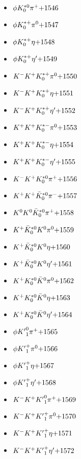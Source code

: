\begin{multicols}{3}
\begin{itemize}
 \item $ \phi K_{0}^{*0} \pi^{+} \hfill{+1546}$
 \item $ \phi K_{0}^{*+} \pi^{0} \hfill{+1547}$
 \item $ \phi K_{0}^{*+} \eta \hfill{+1548}$
 \item $ \phi K_{0}^{*+} {\eta^{\prime}} \hfill{+1549}$
 \item $ K^{-} K^{+} K_{0}^{*+} \pi^{0} \hfill{+1550}$
 \item $ K^{-} K^{+} K_{0}^{*+} \eta \hfill{+1551}$
 \item $ K^{-} K^{+} K_{0}^{*+} {\eta^{\prime}} \hfill{+1552}$
 \item $ K^{+} K^{+} K_{0}^{*-} \pi^{0} \hfill{+1553}$
 \item $ K^{+} K^{+} K_{0}^{*-} \eta \hfill{+1554}$
 \item $ K^{+} K^{+} K_{0}^{*-} {\eta^{\prime}} \hfill{+1555}$
 \item $ K^{-} K^{+} K_{0}^{*0} \pi^{+} \hfill{+1556}$
 \item $ K^{+} K^{+} \bar{K}_{0}^{*0} \pi^{-} \hfill{+1557}$
 \item $ K^{0} K^{0} \bar{K}_{0}^{*0} \pi^{+} \hfill{+1558}$
 \item $ K^{+} \bar{K}_{0}^{*0} K^{0} \pi^{0} \hfill{+1559}$
 \item $ K^{+} \bar{K}_{0}^{*0} K^{0} \eta \hfill{+1560}$
 \item $ K^{+} \bar{K}_{0}^{*0} K^{0} {\eta^{\prime}} \hfill{+1561}$
 \item $ K^{+} K_{0}^{*0} \bar{K}^{0} \pi^{0} \hfill{+1562}$
 \item $ K^{+} K_{0}^{*0} \bar{K}^{0} \eta \hfill{+1563}$
 \item $ K^{+} K_{0}^{*0} \bar{K}^{0} {\eta^{\prime}} \hfill{+1564}$
 \item $ \phi {K^{\prime}}_{1}^{0} \pi^{+} \hfill{+1565}$
 \item $ \phi {K^{\prime}}_{1}^{+} \pi^{0} \hfill{+1566}$
 \item $ \phi {K^{\prime}}_{1}^{+} \eta \hfill{+1567}$
 \item $ \phi {K^{\prime}}_{1}^{+} {\eta^{\prime}} \hfill{+1568}$
 \item $ K^{-} K^{+} {K^{\prime}}_{1}^{0} \pi^{+} \hfill{+1569}$
 \item $ K^{-} K^{+} {K^{\prime}}_{1}^{+} \pi^{0} \hfill{+1570}$
 \item $ K^{-} K^{+} {K^{\prime}}_{1}^{+} \eta \hfill{+1571}$
 \item $ K^{-} K^{+} {K^{\prime}}_{1}^{+} {\eta^{\prime}} \hfill{+1572}$

\end{itemize}
\end{multicols}
